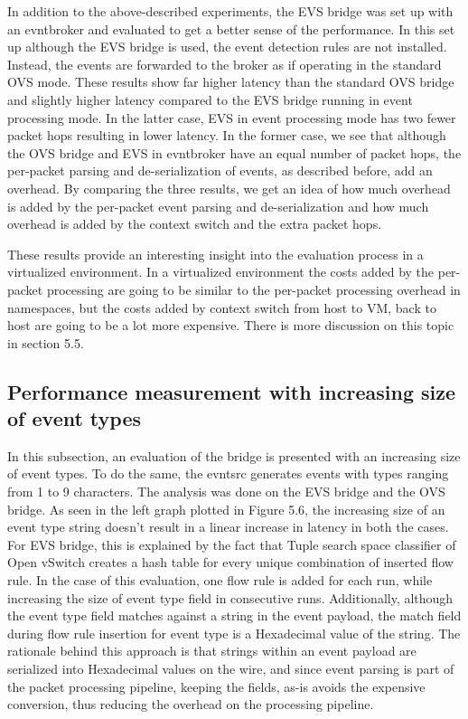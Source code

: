 In addition to the above-described experiments, the EVS bridge was set up with an evntbroker and evaluated to get a better sense of the performance. In this set up although the EVS bridge is used, the event detection rules are not installed. Instead, the events are forwarded to the broker as if operating in the standard OVS mode. These results show far higher latency than the standard OVS bridge and slightly higher latency compared to the EVS bridge running in event processing mode. In the latter case, EVS in event processing mode has two fewer packet hops resulting in lower latency. In the former case, we see that although the OVS bridge and EVS in evntbroker have an equal number of packet hops, the per-packet parsing and de-serialization of events, as described before, add an overhead. By comparing the three results, we get an idea of how much overhead is added by the per-packet event parsing and de-serialization and how much overhead is added by the context switch and the extra packet hops. 

These results provide an interesting insight into the evaluation process in a virtualized environment. In a virtualized environment the costs added by the per-packet processing are going to be similar to the per-packet processing overhead in namespaces, but the costs added by context switch from host to VM, back to host are going to be a lot more expensive. There is more discussion on this topic in section 5.5.

\subsection{Performance measurement with increasing size of event types}
In this subsection, an evaluation of the bridge is presented with an increasing size of event types. To do the same, the evntsrc generates events with types ranging from 1 to 9 characters. The analysis was done on the EVS bridge and the OVS bridge. As seen in the left graph plotted in Figure 5.6, the increasing size of an event type string doesn't result in a linear increase in latency in both the cases. For EVS bridge, this is explained by the fact that Tuple search space classifier of Open vSwitch creates a hash table for every unique combination of inserted flow rule. In the case of this evaluation, one flow rule is added for each run, while increasing the size of event type field in consecutive runs. Additionally, although the event type field matches against a string in the event payload, the match field during flow rule insertion for event type is a Hexadecimal value of the string. The rationale behind this approach is that strings within an event payload are serialized into Hexadecimal values on the wire, and since event parsing is part of the packet processing pipeline, keeping the fields, as-is avoids the expensive conversion, thus reducing the overhead on the processing pipeline. 

